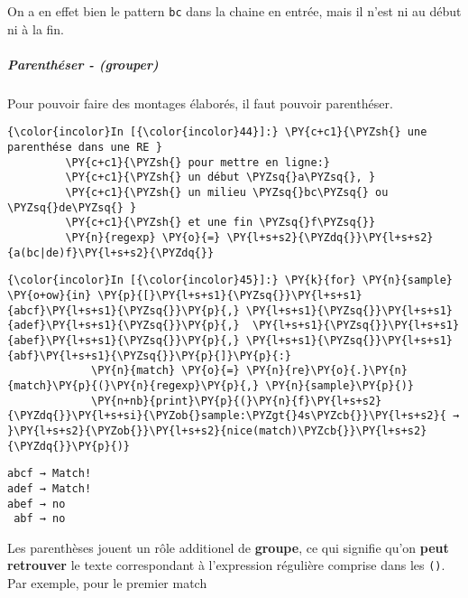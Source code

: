     On a en effet bien le pattern \texttt{bc} dans la chaine en entrée, mais
il n'est ni au début ni à la fin.

    \hypertarget{parenthuxe9ser---grouper}{%
\subparagraph{Parenthéser - (grouper)}\label{parenthuxe9ser---grouper}}

    Pour pouvoir faire des montages élaborés, il faut pouvoir parenthéser.

    \begin{Verbatim}[commandchars=\\\{\},frame=single,framerule=0.3mm,rulecolor=\color{cellframecolor}]
{\color{incolor}In [{\color{incolor}44}]:} \PY{c+c1}{\PYZsh{} une parenthése dans une RE }
         \PY{c+c1}{\PYZsh{} pour mettre en ligne:}
         \PY{c+c1}{\PYZsh{} un début \PYZsq{}a\PYZsq{}, }
         \PY{c+c1}{\PYZsh{} un milieu \PYZsq{}bc\PYZsq{} ou \PYZsq{}de\PYZsq{} }
         \PY{c+c1}{\PYZsh{} et une fin \PYZsq{}f\PYZsq{}}
         \PY{n}{regexp} \PY{o}{=} \PY{l+s+s2}{\PYZdq{}}\PY{l+s+s2}{a(bc|de)f}\PY{l+s+s2}{\PYZdq{}}
\end{Verbatim}


    

    \begin{Verbatim}[commandchars=\\\{\},frame=single,framerule=0.3mm,rulecolor=\color{cellframecolor}]
{\color{incolor}In [{\color{incolor}45}]:} \PY{k}{for} \PY{n}{sample} \PY{o+ow}{in} \PY{p}{[}\PY{l+s+s1}{\PYZsq{}}\PY{l+s+s1}{abcf}\PY{l+s+s1}{\PYZsq{}}\PY{p}{,} \PY{l+s+s1}{\PYZsq{}}\PY{l+s+s1}{adef}\PY{l+s+s1}{\PYZsq{}}\PY{p}{,}  \PY{l+s+s1}{\PYZsq{}}\PY{l+s+s1}{abef}\PY{l+s+s1}{\PYZsq{}}\PY{p}{,} \PY{l+s+s1}{\PYZsq{}}\PY{l+s+s1}{abf}\PY{l+s+s1}{\PYZsq{}}\PY{p}{]}\PY{p}{:}
             \PY{n}{match} \PY{o}{=} \PY{n}{re}\PY{o}{.}\PY{n}{match}\PY{p}{(}\PY{n}{regexp}\PY{p}{,} \PY{n}{sample}\PY{p}{)}
             \PY{n+nb}{print}\PY{p}{(}\PY{n}{f}\PY{l+s+s2}{\PYZdq{}}\PY{l+s+si}{\PYZob{}sample:\PYZgt{}4s\PYZcb{}}\PY{l+s+s2}{ → }\PY{l+s+s2}{\PYZob{}}\PY{l+s+s2}{nice(match)\PYZcb{}}\PY{l+s+s2}{\PYZdq{}}\PY{p}{)}
\end{Verbatim}


    \begin{Verbatim}[commandchars=\\\{\},frame=single,framerule=0.3mm,rulecolor=\color{cellframecolor}]
abcf → Match!
adef → Match!
abef → no
 abf → no
\end{Verbatim}

    Les parenthèses jouent un rôle additionel de \textbf{groupe}, ce qui
signifie qu'on \textbf{peut retrouver} le texte correspondant à
l'expression régulière comprise dans les \texttt{()}. Par exemple, pour
le premier match

